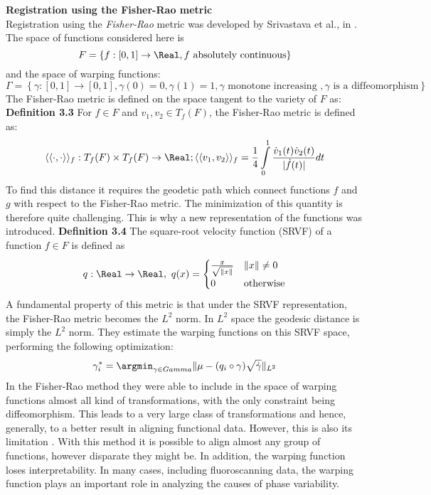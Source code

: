 \noindent
{\bf{Registration using the Fisher-Rao metric}} \\
Registration using the {\emph{Fisher-Rao}} metric was developed by Srivastava et al., in \cite{Srivastava_etal_2011_v2_arXiv}. The space of functions considered here is
\[ F = \left\{f: [0,1] \rightarrow \Real, f \text{ absolutely continuous}  \right\}\] and the space of warping functions:
\[ \Gamma = \left\{\gamma: [0,1] \rightarrow [0,1], \gamma(0) = 0, \gamma(1) = 1, \gamma \text{ monotone increasing }, \gamma \text{ is a diffeomorphism}  \right\} \]
The Fisher-Rao metric is defined on the space tangent to the variety of $F$ as:
{\bf{Definition 3.3}} For $f \in F$ and $v_1, v_2 \in T_f(F)$, the Fisher-Rao metric is defined as: 
\[ \langle\langle \cdot , \cdot \rangle \rangle_f: T_f(F) \times T_f(F) \rightarrow \Real; \langle\langle v_1 , v_2 \rangle \rangle_f = \frac{1}{4} \displaystyle \int \limits_0^1 \frac{\dot{v}_1(t) \dot{v}_2(t)}{|\dot{f}(t) |}dt \]
To find this distance it requires the geodetic path which connect functions $f$ and $g$ with respect to the Fisher-Rao metric. The minimization of this quantity is therefore quite challenging. This is why a  new representation of the functions was introduced.
{\bf{Definition 3.4}} The square-root velocity function (SRVF) of a function $f \in F$ is defined as
\[ q:\Real \rightarrow \Real, \ q(x) = 
  \begin{cases}
    \frac{x}{\sqrt{\|x \|}}       & \|x\| \ne 0 \\
    0 & \text{otherwise} \\
  \end{cases} 
\] 
A fundamental property of this metric is that under the SRVF representation, the Fisher-Rao metric becomes the $L^2$ norm. In $L^2$ space the geodesic distance is simply the $L^2$ norm. They estimate the warping functions on this SRVF space, performing the following optimization:
\[ \gamma_i^* = \argmin_{\gamma \in Gamma} \|\mu - (q_i \circ \gamma)\sqrt{\dot{\gamma}}  \|_{L^2} \]
In the Fisher-Rao method they were able to include in the space of warping functions almost all kind of transformations, with the only constraint being diffeomorphism. This leads to a very large class of transformations and hence, generally, to a better result in aligning functional data. However, this is also its limitation \cite{Patriarca_2013_PhDThesis}. With this method it is possible to align almost any group of functions, however disparate they might be. In addition, the warping function loses interpretability. In many cases, including fluoroscanning data, the warping function plays an important role in analyzing the causes of phase variability. \\

